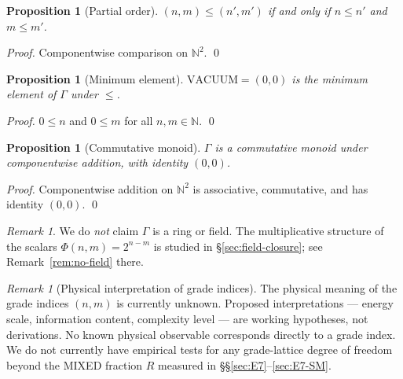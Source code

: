 \documentclass[12pt,a4paper]{article}
\theoremstyle{plain}
\newtheorem{proposition}[theorem]{Proposition}
\theoremstyle{definition}
\theoremstyle{remark}
\newtheorem{remark}[theorem]{Remark}
\begin{document}
\begin{proposition}[Partial order]
\label{prop:order}
$(n,m) \leq (n',m')$ if and only if $n \leq n'$ and $m \leq m'$.
\end{proposition}
\begin{proof}
Componentwise comparison on $\mathbb{N}^2$. \qed
\end{proof}

\begin{proposition}[Minimum element]
\label{prop:vacuum-min}
$\mathrm{VACUUM} = (0,0)$ is the minimum element of $\Gamma$ under $\leq$.
\end{proposition}
\begin{proof}
$0 \leq n$ and $0 \leq m$ for all $n,m\in\mathbb{N}$. \qed
\end{proof}

\begin{proposition}[Commutative monoid]
\label{prop:monoid}
$\Gamma$ is a commutative monoid under componentwise addition, with identity
$(0,0)$.
\end{proposition}
\begin{proof}
Componentwise addition on $\mathbb{N}^2$ is associative, commutative, and has
identity $(0,0)$. \qed
\end{proof}

\begin{remark}
We do \emph{not} claim $\Gamma$ is a ring or field.
The multiplicative structure of the scalars $\Phi(n,m)=2^{n-m}$ is studied
in \S\ref{sec:field-closure}; see Remark~\ref{rem:no-field} there.
\end{remark}

\begin{remark}[Physical interpretation of grade indices]
\label{rem:grade-phys}
The physical meaning of the grade indices $(n,m)$ is currently unknown.
Proposed interpretations --- energy scale, information content, complexity level --- are working hypotheses, not derivations.
No known physical observable corresponds directly to a grade index.
We do not currently have empirical tests for any grade-lattice
degree of freedom beyond the MIXED fraction $R$ measured in
\S\S\ref{sec:E7}--\ref{sec:E7-SM}.
\end{remark}

\end{document}
